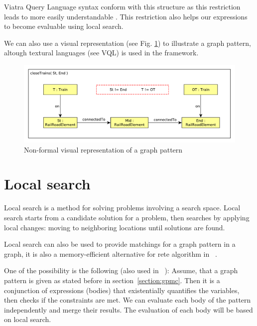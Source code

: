Viatra Query Language syntax conform with this structure as this restriction leads to more easily understandable .
This restriction also helps our expressions to become evaluable using local search.

We can also use a visual representation (see Fig. \ref{fig:pattern-visual}) to illustrate a graph pattern, altough textural languages (see VQL) is used in the framework.

\begin{figure}[h]
	\begin{center}
		\includegraphics[width=\textwidth]{figures/closeTrains-pattern.pdf}
		\caption{Non-formal visual representation of a graph pattern}
		\label{fig:pattern-visual}
	\end{center}
\end{figure}


\section{Local search}

Local search is a method for solving problems involving a search space. 
Local search starts from a candidate solution for a problem, then searches by applying local changes: moving to neighboring locations until solutions are found.

Local search can also be used to provide matchings for a graph pattern in a graph, it is also a memory-efficient alternative for rete algorithm in \viatra ~\cite{bur-marton-msc}.

One of the possibility is the following (also used in ~\cite{bur-marton-msc}):
Assume, that a graph pattern is given as stated before in section~\ref{section:gpmc}.
Then it is a conjunction of expressions (bodies) that existentially quantifies the variables, then checks if the constraints are met.
We can evaluate each body of the pattern independently and merge their results.
The evaluation of each body will be based on local search.

